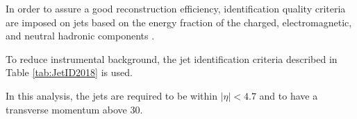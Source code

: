\label{sec:jet_ID}
In order to assure a good reconstruction efficiency, identification quality criteria are imposed on jets based on
the energy fraction of the charged, electromagnetic, and neutral hadronic components \cite{CMS-PAS-JME-16-003}.

To reduce instrumental background, the jet identification criteria described in Table \ref{tab:JetID2018} is used.

\begin{table}
  \caption{Jet identification criteria used in \RunII{} with thresholds used for 2018 data.}
  \label{tab:JetID2018}
\end{table}

In this analysis, the jets are required to be within $|\eta| < 4.7$ and to have a transverse momentum above 30\GeV.


